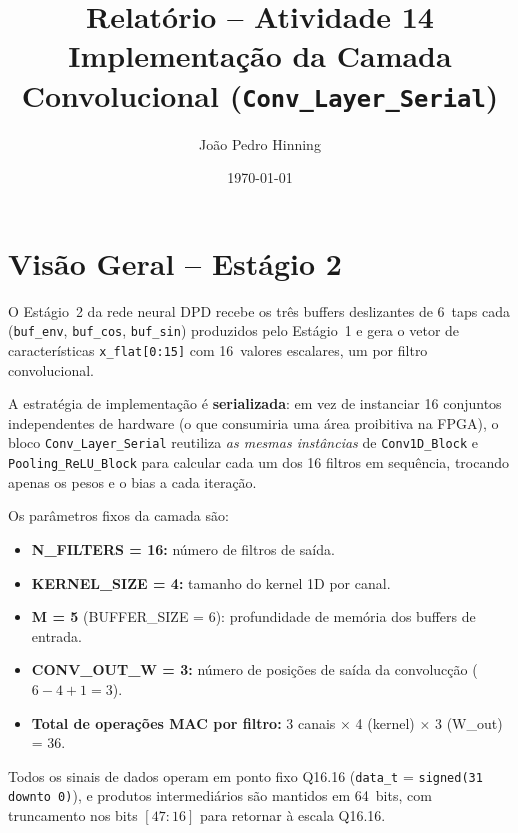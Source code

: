 \documentclass[a4paper,12pt]{article}
\title{Relat\'orio -- Atividade 14 \\
       \large Implementa\c{c}\~ao da Camada Convolucional (\texttt{Conv\_Layer\_Serial})}
\author{Jo\~ao Pedro Hinning}
\date{\today}
\begin{document}
\maketitle
\thispagestyle{fancy}

\section{Vis\~ao Geral -- Est\'agio 2}

O Est\'agio~2 da rede neural DPD recebe os tr\^es buffers deslizantes de 6~taps cada (\texttt{buf\_env}, \texttt{buf\_cos}, \texttt{buf\_sin}) produzidos pelo Est\'agio~1 e gera o vetor de caracter\'isticas \texttt{x\_flat[0:15]} com 16~valores escalares, um por filtro convolucional.

A estrat\'egia de implementa\c{c}\~ao \'e \textbf{serializada}: em vez de instanciar 16 conjuntos independentes de hardware (o que consumiria uma \'area proibitiva na FPGA), o bloco \texttt{Conv\_Layer\_Serial} reutiliza \emph{as mesmas inst\^ancias} de \texttt{Conv1D\_Block} e \texttt{Pooling\_ReLU\_Block} para calcular cada um dos 16 filtros em sequ\^encia, trocando apenas os pesos e o bias a cada itera\c{c}\~ao.

Os par\^ametros fixos da camada s\~ao:
\begin{itemize}
    \item \textbf{N\_FILTERS = 16:} n\'umero de filtros de sa\'ida.
    \item \textbf{KERNEL\_SIZE = 4:} tamanho do kernel 1D por canal.
    \item \textbf{M = 5} (BUFFER\_SIZE = 6): profundidade de mem\'oria dos buffers de entrada.
    \item \textbf{CONV\_OUT\_W = 3:} n\'umero de posi\c{c}\~oes de sa\'ida da convoluc\c{c}\~ao ($6 - 4 + 1 = 3$).
    \item \textbf{Total de opera\c{c}\~oes MAC por filtro:} 3 canais $\times$ 4 (kernel) $\times$ 3 (W\_out) = 36.
\end{itemize}

Todos os sinais de dados operam em ponto fixo Q16.16 (\texttt{data\_t} = \texttt{signed(31 downto 0)}), e produtos intermedi\'arios s\~ao mantidos em 64~bits, com truncamento nos bits $[47\!:\!16]$ para retornar \`a escala Q16.16.


\end{document}
